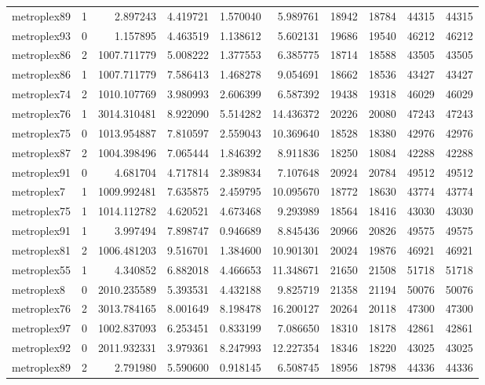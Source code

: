 \begin{longtable}{|l|r|r|r|r|r|r|r|r|r|}
metroplex89 & 1 & 2.897243 & 4.419721 & 1.570040 & 5.989761 & 18942 & 18784 & 44315 & 44315 \\
metroplex93 & 0 & 1.157895 & 4.463519 & 1.138612 & 5.602131 & 19686 & 19540 & 46212 & 46212 \\
metroplex86 & 2 & 1007.711779 & 5.008222 & 1.377553 & 6.385775 & 18714 & 18588 & 43505 & 43505 \\
metroplex86 & 1 & 1007.711779 & 7.586413 & 1.468278 & 9.054691 & 18662 & 18536 & 43427 & 43427 \\
metroplex74 & 2 & 1010.107769 & 3.980993 & 2.606399 & 6.587392 & 19438 & 19318 & 46029 & 46029 \\
metroplex76 & 1 & 3014.310481 & 8.922090 & 5.514282 & 14.436372 & 20226 & 20080 & 47243 & 47243 \\
metroplex75 & 0 & 1013.954887 & 7.810597 & 2.559043 & 10.369640 & 18528 & 18380 & 42976 & 42976 \\
metroplex87 & 2 & 1004.398496 & 7.065444 & 1.846392 & 8.911836 & 18250 & 18084 & 42288 & 42288 \\
metroplex91 & 0 & 4.681704 & 4.717814 & 2.389834 & 7.107648 & 20924 & 20784 & 49512 & 49512 \\
metroplex7 & 1 & 1009.992481 & 7.635875 & 2.459795 & 10.095670 & 18772 & 18630 & 43774 & 43774 \\
metroplex75 & 1 & 1014.112782 & 4.620521 & 4.673468 & 9.293989 & 18564 & 18416 & 43030 & 43030 \\
metroplex91 & 1 & 3.997494 & 7.898747 & 0.946689 & 8.845436 & 20966 & 20826 & 49575 & 49575 \\
metroplex81 & 2 & 1006.481203 & 9.516701 & 1.384600 & 10.901301 & 20024 & 19876 & 46921 & 46921 \\
metroplex55 & 1 & 4.340852 & 6.882018 & 4.466653 & 11.348671 & 21650 & 21508 & 51718 & 51718 \\
metroplex8 & 0 & 2010.235589 & 5.393531 & 4.432188 & 9.825719 & 21358 & 21194 & 50076 & 50076 \\
metroplex76 & 2 & 3013.784165 & 8.001649 & 8.198478 & 16.200127 & 20264 & 20118 & 47300 & 47300 \\
metroplex97 & 0 & 1002.837093 & 6.253451 & 0.833199 & 7.086650 & 18310 & 18178 & 42861 & 42861 \\
metroplex92 & 0 & 2011.932331 & 3.979361 & 8.247993 & 12.227354 & 18346 & 18220 & 43025 & 43025 \\
metroplex89 & 2 & 2.791980 & 5.590600 & 0.918145 & 6.508745 & 18956 & 18798 & 44336 & 44336 \\

\end{longtable}
